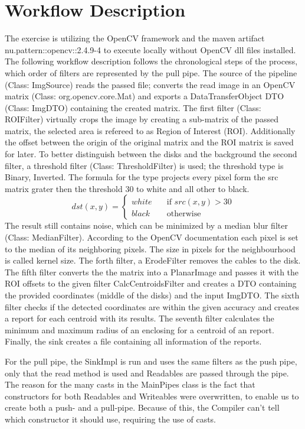 \documentclass[a4paper, 11pt]{scrreprt}
\begin{document}
\chapter{Workflow Description}
The exercise is utilizing the OpenCV framework \parencite{intel_opencv_2019} and the maven artifact nu.pattern::opencv::2.4.9-4 to execute locally without OpenCV dll files installed.
The following workflow description follows the chronological steps of the process, which order of filters are represented by the pull pipe.
The source of the pipeline (Class: ImgSource) reads the passed file; converts the read image in an OpenCV matrix (Class: org.opencv.core.Mat) and exports a DataTransferObject DTO (Class: ImgDTO) containing the created matrix.
The first filter (Class: ROIFilter) virtually crops the image by creating a sub-matrix of the passed matrix, the selected area is refereed to as Region of Interest (ROI). Additionally the offset between the origin of the original matrix and the ROI matrix is saved for later.
To better distinguish between the disks and the background the second filter, a threshold filter (Class: ThresholdFilter) is used; the threshold type is Binary, Inverted.
The formula for the type \parencite{opencv_2.4.13.7_documentation_basic_nodate} projects every pixel form the src matrix grater then the threshold 30 to white and all other to black.
\[ dst(x, y) =
\begin{cases}
white       & \quad \text{if } src(x,y) > 30\\
black  & \quad \text{otherwise}
\end{cases}
\]
The result still contains noise, which can be minimized by a median blur filter (Class: MedianFilter). According to the OpenCV documentation \parencite{opencv_3.4.8_documentation_opencv:_nodate} each pixel is set to the median of its neighboring pixels.
The size in pixels for the neighbourhood is called kernel size.
The forth filter, a ErodeFilter removes the cables to the disk.
The fifth filter converts the the matrix into a PlanarImage and passes it with the ROI offsets to the given filter CalcCentroidsFilter and creates a DTO containing the provided coordinates (middle of the disks) and the input ImgDTO\@.
The sixth filter checks if the detected coordinates are within the given accuracy and creates a report for each centroid with its results.
The seventh filter calculates the minimum and maximum radius of an enclosing for a centroid of an report.
Finally, the sink creates a file containing all information of the reports.

For the pull pipe, the SinkImpl is run and uses the same filters as the push pipe, only that the read method is used and
Readables are passed through the pipe.
The reason for the many casts in the MainPipes class is the fact that constructors for both Readables and Writeables were
overwritten, to enable us to create both a push- and a pull-pipe. Because of this, the Compiler can't tell which constructor
it should use, requiring the use of casts.
\printbibliography
\end{document}
